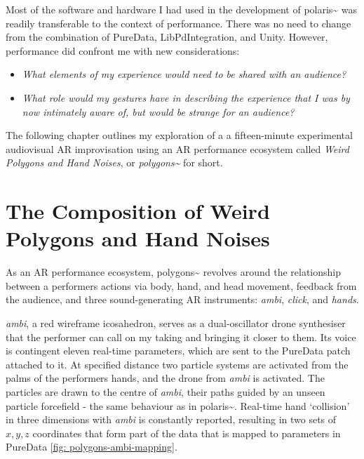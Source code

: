 Most of the software and hardware I had used in the development of polaris\textasciitilde{} was readily transferable to the context of performance. There was no need to change from the combination of PureData, LibPdIntegration, and Unity. However, performance did confront me with new considerations: 
\begin{itemize}
    \item \textit{What elements of my experience would need to be shared with an audience?} 
    \item \textit{What role would my gestures have in describing the experience that I was by now intimately aware of, but would be strange for an audience?} 
\end{itemize}
The following chapter outlines my exploration of a a fifteen-minute experimental audiovisual AR improvisation using an AR performance ecosystem called \textit{Weird Polygons and Hand Noises}, or \textit{polygons\textasciitilde{}} for short.



\section{The Composition of Weird Polygons and Hand Noises} \label{sec: polygons-composition}

As an AR performance ecosystem, polygons\textasciitilde{} revolves around the relationship between a performers actions via body, hand, and head movement, feedback from the audience, and three sound-generating AR instruments: \textit{ambi}, \textit{click}, and \textit{hands}.


\textit{ambi}, a red wireframe icosahedron, serves as a dual-oscillator drone synthesiser that the performer can call on my taking and bringing it closer to them. Its voice is contingent eleven real-time parameters, which are sent to the PureData patch attached to it. At specified distance two particle systems are activated from the palms of the performers hands, and the drone from \textit{ambi} is activated. The particles are drawn to the centre of \textit{ambi}, their paths guided by an unseen particle forcefield - the same behaviour as in polaris\textasciitilde{}. Real-time hand `collision' in three dimensions with \textit{ambi} is constantly reported, resulting in two sets of $x,y,z$ coordinates that form part of the data that is mapped to parameters in PureData \autoref{fig: polygons-ambi-mapping}.

